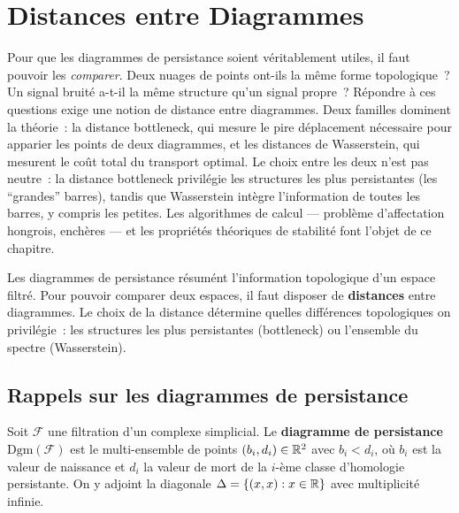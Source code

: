 \chapter{Distances entre Diagrammes}
\label{ch:distances}

Pour que les diagrammes de persistance soient v\'eritablement utiles, il faut pouvoir les \emph{comparer}. Deux nuages de points ont-ils la m\^eme forme topologique~? Un signal bruit\'e a-t-il la m\^eme structure qu'un signal propre~? R\'epondre \`a ces questions exige une notion de distance entre diagrammes. Deux familles dominent la th\'eorie~: la distance bottleneck, qui mesure le pire d\'eplacement n\'ecessaire pour apparier les points de deux diagrammes, et les distances de Wasserstein, qui mesurent le co\^ut total du transport optimal. Le choix entre les deux n'est pas neutre~: la distance bottleneck privil\'egie les structures les plus persistantes (les ``grandes'' barres), tandis que Wasserstein int\`egre l'information de toutes les barres, y compris les petites. Les algorithmes de calcul --- probl\`eme d'affectation hongrois, enchères --- et les propri\'et\'es th\'eoriques de stabilit\'e font l'objet de ce chapitre.

\begin{intuition}
Les diagrammes de persistance r\'esum\'ent
l'information topologique d'un espace filtr\'e. Pour pouvoir comparer deux
espaces, il faut disposer de \textbf{distances} entre diagrammes. Le choix
de la distance d\'etermine quelles diff\'erences topologiques on privil\'egie~:
les structures les plus persistantes (bottleneck)
ou l'ensemble du spectre (Wasserstein).
\end{intuition}

\section{Rappels sur les diagrammes de persistance}

\begin{definition}
Soit $\mathcal{F}$ une filtration d'un complexe simplicial. Le
\textbf{diagramme de persistance}
$\mathrm{Dgm}(\mathcal{F})$ est le multi-ensemble de points
$(b_i, d_i) \in \mathbb{R}^2$ avec $b_i < d_i$, o\`u $b_i$ est la valeur de
naissance et $d_i$ la valeur de mort de la $i$-\`eme classe d'homologie
persistante. On y adjoint la diagonale $\Delta = \{(x,x) : x \in \mathbb{R}\}$
avec multiplicit\'e infinie.
\end{definition}

